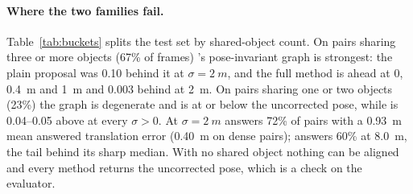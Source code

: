 \paragraph{Where the two families fail.}
Table~\ref{tab:buckets} splits the test set by shared-object count. On pairs sharing three or more objects (67\% of frames) \freealign's pose-invariant graph is strongest: the plain proposal was 0.10 behind it at $\sigma=\SI{2}{m}$, and the full method is ahead at 0, \SI{0.4}{m} and \SI{1}{m} and 0.003 behind at \SI{2}{m}. On pairs sharing one or two objects (23\%) the graph is degenerate and \freealign is at or below the uncorrected pose, while \paper is 0.04--0.05 above \freealign at every $\sigma>0$. At $\sigma=\SI{2}{m}$ \paper answers 72\% of pairs with a \SI{0.93}{m} mean answered translation error (\SI{0.40}{m} on dense pairs); \freealign answers 60\% at \SI{8.0}{m}, the tail behind its sharp median. With no shared object nothing can be aligned and every method returns the uncorrected pose, which is a check on the evaluator.

\begin{table}[t]
  \centering\small
  \caption{\textbf{\vxreal test  by shared-object bucket.} Full method in the \paper column.}
  \label{tab:buckets}
\end{table}

